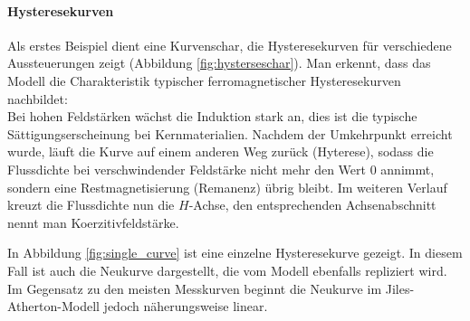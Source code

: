 \documentclass{scrartcl}
\begin{document}
\paragraph{Hysteresekurven} Als erstes Beispiel dient eine Kurvenschar, die Hysteresekurven für verschiedene Aussteuerungen zeigt (Abbildung \ref{fig:hysterseschar}). Man erkennt, dass das Modell die Charakteristik typischer ferromagnetischer Hysteresekurven nachbildet:\\
Bei hohen Feldstärken wächst die Induktion stark an, dies ist die typische Sättigungserscheinung bei Kernmaterialien. Nachdem der Umkehrpunkt erreicht wurde, läuft die Kurve auf einem anderen Weg zurück (Hyterese), sodass die Flussdichte bei verschwindender Feldstärke nicht mehr den Wert $0$ annimmt, sondern eine Restmagnetisierung (Remanenz) übrig bleibt. Im weiteren Verlauf kreuzt die Flussdichte nun die $H$-Achse, den entsprechenden Achsenabschnitt nennt man Koerzitivfeldstärke.
\begin{figure}[h]
\end{figure}
\par In Abbildung \ref{fig:single_curve} ist eine einzelne Hysteresekurve gezeigt. In diesem Fall ist auch die Neukurve dargestellt, die vom Modell ebenfalls repliziert wird. Im Gegensatz zu den meisten Messkurven beginnt die Neukurve im Jiles-Atherton-Modell jedoch näherungsweise linear. 
\end{document}
